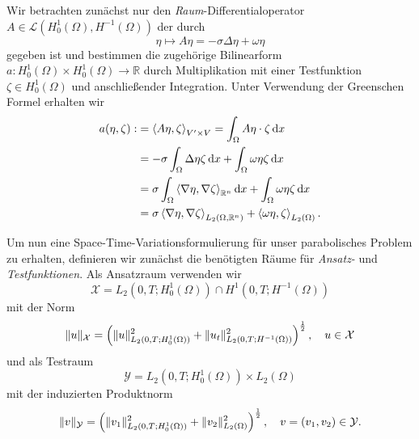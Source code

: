 Wir betrachten zunächst nur den \emph{Raum}-Differentialoperator $A \in \mathcal L(H^{1}_{0}(\Omega), H^{-1}(\Omega))$ der durch
\begin{equation}
    \eta \mapsto A \eta = - \sigma \Delta \eta + \omega \eta
\end{equation}
gegeben ist und bestimmen die zugehörige Bilinearform $a \colon H^{1}_{0}(\Omega) \times H^{1}_{0}(\Omega) \to \mathbb{R}$ durch Multiplikation mit einer Testfunktion $\zeta \in H^{1}_{0}(\Omega)$ und anschließender Integration.
Unter Verwendung der Greenschen Formel erhalten wir
\begin{equation}
    \label{eq:a_bf}
    \begin{aligned}
        a(\eta, \zeta)
        :&= \left\langle A \eta,\zeta\right\rangle_{V' \times V}
        = \int_{\Omega} A \eta \cdot \zeta \mathop{}\!\mathrm{d} x
        \\&= - \sigma \int_{\Omega} \Delta \eta \zeta \mathop{}\!\mathrm{d} x + \int_{\Omega} \omega \eta \zeta \mathop{}\!\mathrm{d} x
        \\ &= \sigma \int_{\Omega} \left\langle\nabla \eta,\nabla \zeta\right\rangle_{\mathbb{R}^{n}} \mathop{}\!\mathrm{d} x + \int_{\Omega} \omega \eta \zeta \mathop{}\!\mathrm{d} x
        \\&= \sigma \left\langle\nabla \eta,\nabla \zeta\right\rangle_{L_{2}(\Omega, \mathbb{R}^{n})} + \left\langle\omega \eta,\zeta\right\rangle_{L_{2}(\Omega)}.
    \end{aligned}
\end{equation}

Um nun eine Space-Time-Variationsformulierung für unser parabolisches Problem zu erhalten, definieren wir zunächst die benötigten Räume für \emph{Ansatz-} und \emph{Testfunktionen}.
Als Ansatzraum verwenden wir
\begin{equation}
    \mathcal X = L_{2}(0, T; H^{1}_{0}(\Omega)) \cap H^{1}(0, T; H^{-1}(\Omega))
\end{equation}
mit der Norm
\begin{equation}
    \lVert u\rVert_{\mathcal X} = \left( \lVert u\rVert_{L_{2}(0, T; H^{1}_{0}(\Omega))}^{2} + \lVert u_{t}\rVert_{L_{2}(0, T; H^{-1}(\Omega))}^{2} \right)^{\frac 12}, \quad u \in \mathcal X
\end{equation}
und als Testraum
\begin{equation}
    \mathcal Y = L_{2}(0, T; H^{1}_{0}(\Omega)) \times L_{2}(\Omega)
\end{equation}
mit der induzierten Produktnorm
\begin{equation}
    \lVert v\rVert_{\mathcal Y} = \left( \lVert v_{1}\rVert_{L_{2}(0, T; H^{1}_{0}(\Omega))}^{2} + \lVert v_{2}\rVert_{L_{2}(\Omega)}^{2} \right)^{\frac 12}, \quad v = (v_{1}, v_{2}) \in \mathcal Y.
\end{equation}

